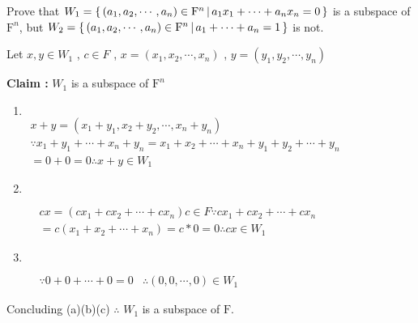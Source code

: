 Prove that $W_1 = \left\{ \,\left(a_1,a_2,\cdots,a_n\right) \in \mathrm{F}^n \,|\, a_1x_1+\cdots+a_nx_n = 0 \,\right\}$ is a subspace of $\mathrm{F}^n$, but $W_2 = \left\{ \, \left( a_1,a_2,\cdots ,a_n \right) \in \mathrm{F}^n \, | \, a_1+\cdots+a_n = 1 \,\right\}$ is not.

\begin{tcolorbox}
\begin{solution}
	Let $x,y \in W_1$ , $c \in F$ , $x = (x_1,x_2,\cdots,x_n)$ , $y=(y_1,y_2,\cdots,y_n)$
	
	\textbf{Claim : }$W_1$ is a subspace of $\mathrm{F}^n$
	\begin{enumerate}
		\item $ $\\ 
		$\begin{array}{ll}
		x+y  =  (x_1+y_1,x_2+y_2,\cdots,x_n+y_n)  \\ 
		\because x_1 + y_1 + \cdots +  x_n + y_n   =   x_1 +x_2 +\cdots +x_n + y_1 + y_2 + \cdots + y_n   \\
		  =  0 + 0   =  0 \therefore x+y \in W_1
		\end{array}$
		\item $ $
		
		$\begin{array}{lll}
			&cx = (cx_1+cx_2+\cdots + cx_n)  c \in F \because cx_1+cx_2+\cdots+cx_n\\
			& =c(x_1+x_2+\cdots+x_n) = c*0 = 0
			\therefore cx \in W_1 
		\end{array}$
		\item $ $		
		
		$\begin{array}{lll}
			&\because 0+0+\cdots+0=0   
			&\therefore (0,0,\cdots,0) \in W_1 
		\end{array}$
	\end{enumerate}
	
	Concluding (a)(b)(c) $\therefore$ $W_1$ is a subspace of $\mathrm{F}$.
\end{solution}

\end{tcolorbox}